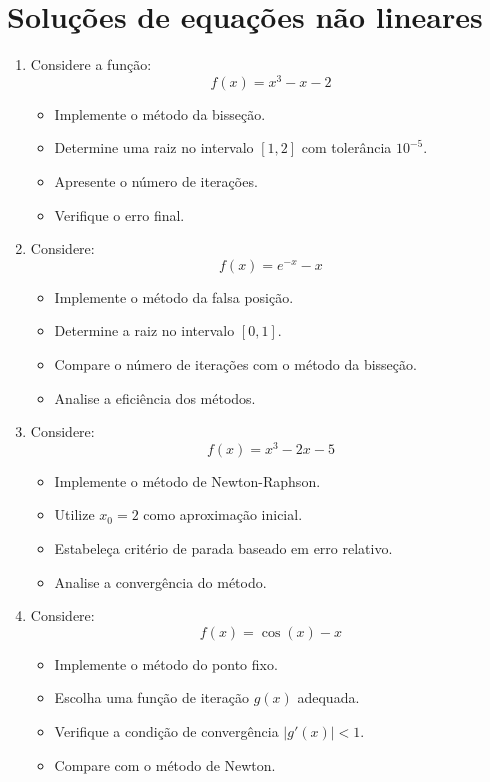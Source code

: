 \section{Soluções de equações não lineares} \label{sec:SolSistNaoLineares}

\begin{enumerate}[label = \thesection.\arabic*]
	
\item Considere a função:
\[
f(x) = x^3 - x - 2
\]

\begin{itemize}
    \item Implemente o método da bisseção.
    \item Determine uma raiz no intervalo $[1,2]$ com tolerância $10^{-5}$.
    \item Apresente o número de iterações.
    \item Verifique o erro final.
\end{itemize}

\item Considere:
\[
f(x) = e^{-x} - x
\]

\begin{itemize}
    \item Implemente o método da falsa posição.
    \item Determine a raiz no intervalo $[0,1]$.
    \item Compare o número de iterações com o método da bisseção.
    \item Analise a eficiência dos métodos.
\end{itemize}

\item Considere:
\[
f(x) = x^3 - 2x - 5
\]

\begin{itemize}
    \item Implemente o método de Newton-Raphson.
    \item Utilize $x_0 = 2$ como aproximação inicial.
    \item Estabeleça critério de parada baseado em erro relativo.
    \item Analise a convergência do método.
\end{itemize}

\item Considere:
\[
f(x) = \cos(x) - x
\]

\begin{itemize}
    \item Implemente o método do ponto fixo.
    \item Escolha uma função de iteração $g(x)$ adequada.
    \item Verifique a condição de convergência $|g'(x)| < 1$.
    \item Compare com o método de Newton.
\end{itemize}


\end{enumerate}
